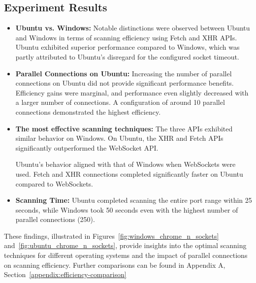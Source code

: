 \subsection{Experiment Results}

\begin{itemize}
  \item \textbf{Ubuntu vs. Windows:} Notable distinctions were observed between Ubuntu and Windows in terms of scanning efficiency using Fetch and XHR APIs. Ubuntu exhibited superior performance compared to Windows, which was partly attributed to Ubuntu's disregard for the configured socket timeout.

  \item \textbf{Parallel Connections on Ubuntu:} Increasing the number of parallel connections on Ubuntu did not provide significant performance benefits. Efficiency gains were marginal, and performance even slightly decreased with a larger number of connections. A configuration of around 10 parallel connections demonstrated the highest efficiency.

  \item \textbf{The most effective scanning techniques:} The three APIs exhibited similar behavior on Windows. On Ubuntu, the XHR and Fetch APIs significantly outperformed the WebSocket API.
  
  Ubuntu's behavior aligned with that of Windows when WebSockets were used. Fetch and XHR connections completed significantly faster on Ubuntu compared to WebSockets.

  \item \textbf{Scanning Time:} Ubuntu completed scanning the entire port range within 25 seconds, while Windows took 50 seconds even with the highest number of parallel connections (250).

\end{itemize}

These findings, illustrated in Figures~\ref{fig:windows_chrome_n_sockets} and~\ref{fig:ubuntu_chrome_n_sockets}, provide insights into the optimal scanning techniques for different operating systems and the impact of parallel connections on scanning efficiency. Further comparisons can be found in Appendix A, Section~\ref{appendix:efficiency-comparison}

